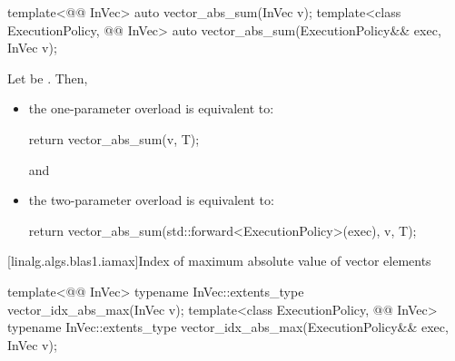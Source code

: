 \begin{itemdecl}
template<@@ InVec>
  auto vector_abs_sum(InVec v);
template<class ExecutionPolicy, @@ InVec>
  auto vector_abs_sum(ExecutionPolicy&& exec, InVec v);
\end{itemdecl}

\begin{itemdescr}
\pnum
\effects
Let  be .
Then,
\begin{itemize}
\item
the one-parameter overload is equivalent to:
\begin{codeblock}
return vector_abs_sum(v, T{});
\end{codeblock}
and
\item
the two-parameter overload is equivalent to:
\begin{codeblock}
return vector_abs_sum(std::forward<ExecutionPolicy>(exec), v, T{});
\end{codeblock}
\end{itemize}
\end{itemdescr}

[linalg.algs.blas1.iamax]{Index of maximum absolute value of vector elements}

\begin{itemdecl}
template<@@ InVec>
  typename InVec::extents_type vector_idx_abs_max(InVec v);
template<class ExecutionPolicy, @@ InVec>
  typename InVec::extents_type vector_idx_abs_max(ExecutionPolicy&& exec, InVec v);
\end{itemdecl}

